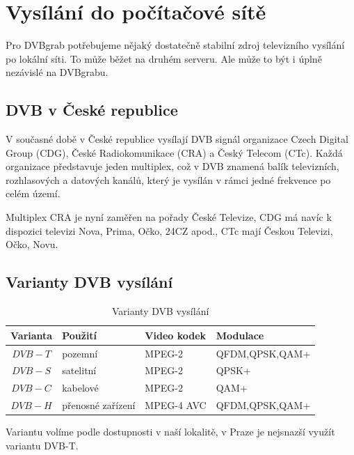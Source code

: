 \chapter{Vysílání do počítačové sítě}

Pro DVBgrab potřebujeme nějaký dostatečně stabilní zdroj televizního vysílání po lokální síti. To může běžet na druhém serveru. Ale může to být i úplně nezávislé na DVBgrabu.

\vspace{10pt}
\section{DVB v České republice}

V současné době v České republice vysílají DVB signál organizace Czech Digital Group (CDG), České Radiokomunikace (CRA) a Český Telecom (CTc). Každá organizace představuje jeden multiplex, což v DVB znamená balík televizních, rozhlasových a datových kanálů, který je vysílán v rámci jedné frekvence po celém území.

Multiplex CRA je nyní zaměřen na pořady České Televize, CDG má navíc k dispozici televizi Nova, Prima, Očko, 24CZ apod., CTc mají Českou Televizi, Očko, Novu.

\section{Varianty DVB vysílání}

\begin{table}
\begin{center}
\begin{tabular}{|c|l|l|l|}
\hline
\bf{Varianta} & \bf{Použití} & \bf{Video kodek} & \bf{Modulace} \\
\hline
$DVB-T$ & pozemní & MPEG-2 & QFDM,QPSK,QAM+\\
\hline
$DVB-S$ & satelitní & MPEG-2 & QPSK+\\
\hline
$DVB-C$ & kabelové & MPEG-2 & QAM+\\
\hline
$DVB-H$ & přenosné zařízení & MPEG-4 AVC & QFDM,QPSK,QAM+\\
\hline
\end{tabular}
\end{center}
\caption{Varianty DVB vysílání}
\label{tab:tab1}
\end{table}

Variantu volíme podle dostupnosti v naší lokalitě, v Praze je nejsnazší využít variantu DVB-T.

\vspace{10pt}

